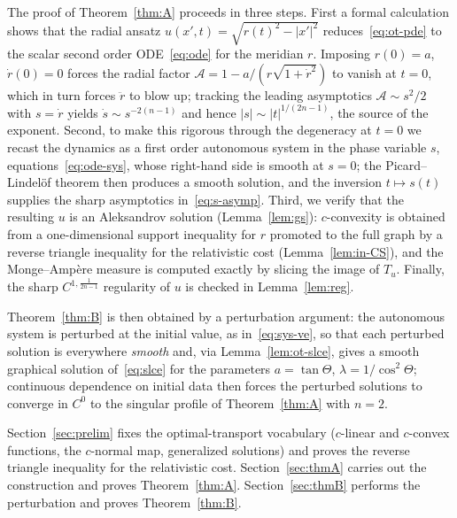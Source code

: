 \documentclass[12pt,letterpaper]{amsart}
\theoremstyle{definition}
\theoremstyle{plain}
\numberwithin{equation}{section}
\begin{document}
The proof of Theorem~\ref{thm:A} proceeds in three steps.
First a formal calculation shows that the radial ansatz
$u(x',t)=\sqrt{r(t)^2-|x'|^2}$ reduces~\eqref{eq:ot-pde} to the scalar second order
ODE~\eqref{eq:ode} for the meridian $r$.
Imposing $r(0)=a$, $\dot r(0)=0$ forces the radial factor $\mathcal{A}=1-a/(r\sqrt{1+\dot r^2})$ to
vanish at $t=0$, which in turn forces $\ddot r$ to blow up; tracking the leading asymptotics
$\mathcal{A}\sim s^2/2$ with $s=\dot r$ yields $\dot s\sim s^{-2(n-1)}$ and hence $|s|\sim|t|^{1/(2n-1)}$,
the source of the exponent.
Second, to make this rigorous through the degeneracy at $t=0$ we recast the dynamics as a
first order autonomous system in the phase variable $s$, equations~\eqref{eq:ode-sys}, whose
right-hand side is smooth at $s=0$; the Picard--Lindel\"of theorem then produces a smooth solution, and the inversion $t\mapsto s(t)$ supplies the sharp asymptotics
in~\eqref{eq:s-asymp}.
Third, we verify that the resulting $u$ is an Aleksandrov solution (Lemma~\ref{lem:gs}): $c$-convexity is
obtained from a one-dimensional support inequality for $r$ promoted to the full graph by a reverse triangle inequality for the relativistic cost (Lemma~\ref{lem:in-CS}), and the
Monge--Amp\`ere measure is computed exactly by slicing the image of $T_u$.
Finally, the sharp $C^{1,\frac{1}{2n-1}}$ regularity of $u$ is checked in Lemma~\ref{lem:reg}.

Theorem~\ref{thm:B} is then obtained by a perturbation argument:
the autonomous system is perturbed at the initial value, as in~\eqref{eq:sys-ve}, so that each perturbed solution is everywhere {\it smooth} and, via Lemma~\ref{lem:ot-slce}, gives a
smooth graphical solution of~\eqref{eq:slce} for the parameters $a=\tan\Theta$,
$\lambda=1/\cos^2\Theta$; continuous dependence on initial data then forces the perturbed
solutions to converge in $C^0$ to the singular profile of Theorem~\ref{thm:A} with $n=2$.


Section~\ref{sec:prelim} fixes the optimal-transport vocabulary ($c$-linear and $c$-convex
functions, the $c$-normal map, generalized solutions) and proves the reverse triangle
inequality for the relativistic cost.
Section~\ref{sec:thmA} carries out the construction and proves Theorem~\ref{thm:A}.
Section~\ref{sec:thmB} performs the perturbation and proves Theorem~\ref{thm:B}.
\end{document}

